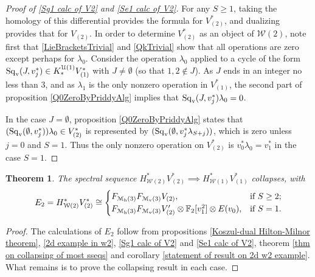 \documentclass[11pt]{amsart}
\theoremstyle{plain}
\newtheorem{thm}{Theorem}[section]
\theoremstyle{definition}
\newcommand{\calW}{\mathcal{W}}
\newcommand{\calU}{\mathcal{U}}
\newcommand{\calmv}{\mathcal{M}_\textup{v}}
\newcommand{\calmh}{\mathcal{M}_\textup{h}}
\theoremstyle{plain}
\newcommand{\Sqv}{\mathrm{Sq}_\textup{v}}
\newcommand{\F}{\mathbb{F}}
\begin{document}
\begin{Calculations of HWn for n nonzero}
\begin{proof}[Proof of \ref{Sg1 calc of V2} and \ref{Se1 calc of V2}]
For any $S\geq1$, taking the homology of this differential provides the formula for $V^*_{(2)}$, and dualizing provides that for $V_{(2)}$.
In order to determine $V^*_{(2)}$ as an object of $\calW(2)$, note first that \ref{LieBracketsTrivial} and \ref{QkTrivial} show that all operations are zero except perhaps for $\lambda_0$. %
Consider the operation $\lambda_0$ applied to a cycle of the form $\Sqv(J,v_{j}^*)\in K_{*}^{\calU(1)}V^*_{(1)}$ with $J\neq\emptyset$ (so that $1,2\notin J$). As $J$ ends in an integer no less than 3, and as $\lambda_1$ is the only nonzero operation in $V^*_{(1)}$, the second part of proposition \ref{Q0ZeroByPriddyAlg} implies that $\Sqv(J,v_{j}^*)\lambda_0=0$.

In the case $J=\emptyset$, proposition \ref{Q0ZeroByPriddyAlg} states that $(\Sqv(\emptyset,v_{j}^*))\lambda_0\in V^*_{(2)}$ is represented by $(\Sqv(\emptyset,v_{j}^*\lambda_{S+j}))$, which is zero unless $j=0$ and $S=1$. Thus the only nonzero operation on $V^*_{(2)}$ is $v_0^*\lambda_0=v_1^*$ in the case $S=1$.
\end{proof}
\begin{thm}\label{W2 to W1 collapse}
The spectral sequence $H^*_{\calW(2)}V^*_{(2)}\implies H^*_{\calW(1)}V^*_{(1)}$ collapses, with
\[E_2=H^*_{\calW(2)}V^*_{(2)}\cong\begin{cases}
F_{\calmh(3)}F_{\calmv(3)}V_{(2)},&\textup{if }S\geq2;\\
F_{\calmh(3)}F_{\calmv(3)}V'_{(2)}\otimes \F_2[v_1^{2}]\otimes E(v_0),&\textup{if }S=1.
\end{cases}
\]
\end{thm}
\begin{proof}
The calculations of $E_2$ follow from propositions \ref{Koszul-dual Hilton-Milnor theorem}, \ref{2d example in w2}, \ref{Sg1 calc of V2} and \ref{Se1 calc of V2}, theorem \ref{thm on collapsing of most sseqs} and corollary \ref{statement of result on 2d w2 example}. What remains is to prove the collapsing result in each case.


\end{proof}
\end{Calculations of HWn for n nonzero}
\end{document}
